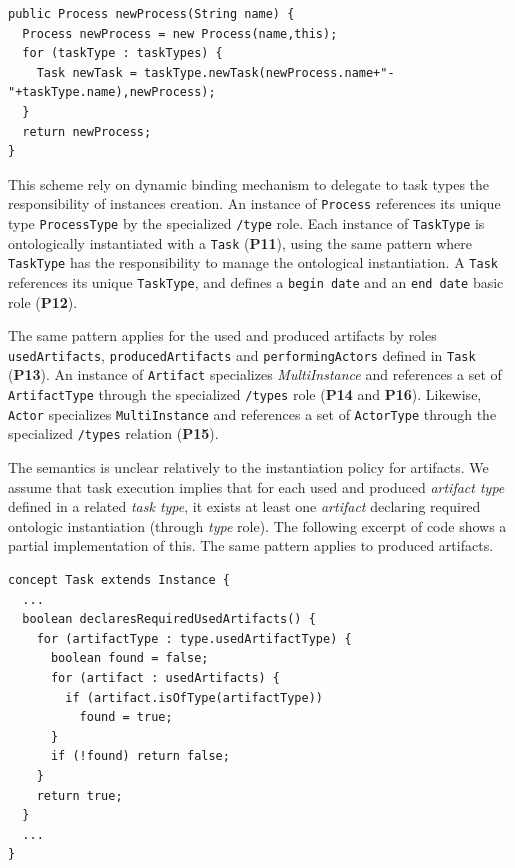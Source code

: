 \begin{lstlisting}
public Process newProcess(String name) {    
  Process newProcess = new Process(name,this);  
  for (taskType : taskTypes) {      
    Task newTask = taskType.newTask(newProcess.name+"-"+taskType.name),newProcess);        
  }      
  return newProcess;    
}    
\end{lstlisting}

This scheme rely on \FML dynamic binding mechanism to delegate to task types the responsibility of instances creation. An instance of \texttt{Process} references its unique type \texttt{ProcessType} by the specialized \texttt{/type} role. Each instance of \texttt{TaskType} is ontologically instantiated with a \texttt{Task} (\textbf{P11}), using the same pattern where \texttt{TaskType} has the responsibility to manage the ontological instantiation. A \texttt{Task} references its unique \texttt{TaskType}, and defines a \texttt{begin date} and an \texttt{end date} basic role (\textbf{P12}).

The same pattern applies for the used and produced artifacts by roles \texttt{usedArtifacts}, \texttt{producedArtifacts} and \texttt{performingActors} defined in \texttt{Task} (\textbf{P13}). An instance of \texttt{Artifact} specializes \textit{MultiInstance} and references a set of \texttt{ArtifactType} through the specialized \texttt{/types} role (\textbf{P14} and \textbf{P16}). Likewise, \texttt{Actor} specializes \texttt{MultiInstance} and references a set of \texttt{ActorType} through the specialized \texttt{/types} relation (\textbf{P15}).

The semantics is unclear relatively to the instantiation policy for artifacts. We assume that task execution implies that for each used and produced \emph{artifact type} defined in a related \emph{task type}, it exists at least one \emph{artifact} declaring required ontologic instantiation (through \textit{type} role). The following excerpt of \FML code shows a partial implementation of this. The same pattern applies to produced artifacts.

\begin{lstlisting}
concept Task extends Instance {
  ...
  boolean declaresRequiredUsedArtifacts() {
    for (artifactType : type.usedArtifactType) {
      boolean found = false;
      for (artifact : usedArtifacts) {
        if (artifact.isOfType(artifactType))
          found = true;
      }
      if (!found) return false;
    }
    return true;
  }
  ...
}    
\end{lstlisting}

